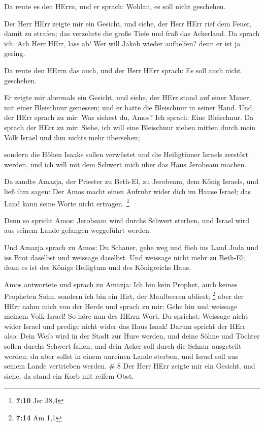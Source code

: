  Da reute es den HErrn, und er sprach: Wohlan, es soll nicht
geschehen.

 Der Herr HErr zeigte mir ein Gesicht, und siehe, der Herr
HErr rief dem Feuer, damit zu strafen; das verzehrte die große Tiefe und
fraß das Ackerland.  Da sprach ich: Ach Herr HErr, lass ab!
Wer will Jakob wieder aufhelfen? denn er ist ja gering.

 Da reute den HErrn das auch, und der Herr HErr sprach: Es
soll auch nicht geschehen.

 Er zeigte mir abermals ein Gesicht, und siehe, der HErr
stand auf einer Mauer, mit einer Bleischnur gemessen; und er hatte die
Bleischnur in seiner Hand.  Und der HErr sprach zu mir: Was
siehest du, Amos? Ich sprach: Eine Bleischnur. Da sprach der HErr zu
mir: Siehe, ich will eine Bleischnur ziehen mitten durch mein Volk
Israel und ihm nichts mehr übersehen;

 sondern die Höhen Isaaks sollen verwüstet und die
Heiligtümer Israels zerstört werden, und ich will mit dem Schwert mich
über das Haus Jerobeam machen.

 Da sandte Amazja, der Priester zu Beth-El, zu Jerobeam,
dem König Israels, und ließ ihm sagen: Der Amos macht einen Aufruhr
wider dich im Hause Israel; das Land kann seine Worte nicht ertragen.
\footnote{\textbf{7:10} Jer 38,4}

 Denn so spricht Amos: Jerobeam wird durchs Schwert
sterben, und Israel wird aus seinem Lande gefangen weggeführt werden.

 Und Amazja sprach zu Amos: Du Schauer, gehe weg und flieh
ins Land Juda und iss Brot daselbst und weissage daselbst. 
Und weissage nicht mehr zu Beth-El; denn es ist des Königs Heiligtum und
des Königreichs Haus.

 Amos antwortete und sprach zu Amazja: Ich bin kein
Prophet, auch keines Propheten Sohn, sondern ich bin ein Hirt, der
Maulbeeren abliest; \footnote{\textbf{7:14} Am 1,1}  aber
der HErr nahm mich von der Herde und sprach zu mir: Gehe hin und
weissage meinem Volk Israel!  So höre nun des HErrn Wort.
Du sprichst: Weissage nicht wider Israel und predige nicht wider das
Haus Isaak!  Darum spricht der HErr also: Dein Weib wird in
der Stadt zur Hure werden, und deine Söhne und Töchter sollen durchs
Schwert fallen, und dein Acker soll durch die Schnur ausgeteilt werden;
du aber sollst in einem unreinen Lande sterben, und Israel soll aus
seinem Lande vertrieben werden. \# 8  Der Herr HErr zeigte
mir ein Gesicht, und siehe, da stand ein Korb mit reifem Obst.

